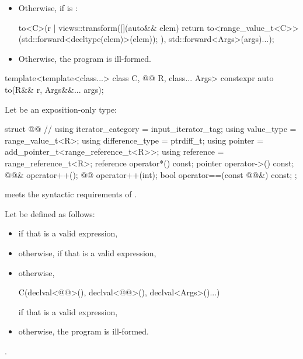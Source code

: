 \begin{itemdescr}
\begin{itemize}
\item
Otherwise,
if  is :
\begin{codeblock}
to<C>(r | views::transform([](auto&& elem) {
  return to<range_value_t<C>>(std::forward<decltype(elem)>(elem));
}), std::forward<Args>(args)...);
\end{codeblock}

\item
Otherwise, the program is ill-formed.
\end{itemize}
\end{itemdescr}

%
\begin{itemdecl}
template<template<class...> class C, @@ R, class... Args>
  constexpr auto to(R&& r, Args&&... args);
\end{itemdecl}

\begin{itemdescr}
\pnum
Let  be an exposition-only type:
\begin{codeblock}
struct @@ {                        // \expos
  using iterator_category = input_iterator_tag;
  using value_type = range_value_t<R>;
  using difference_type = ptrdiff_t;
  using pointer = add_pointer_t<range_reference_t<R>>;
  using reference = range_reference_t<R>;
  reference operator*() const;
  pointer operator->() const;
  @@& operator++();
  @@ operator++(int);
  bool operator==(const @@&) const;
};
\end{codeblock}
\begin{note}
 meets
the syntactic requirements of .
\end{note}

\pnum
Let  be defined as follows:
\begin{itemize}
\item
{} if that is a valid expression,
\item
otherwise, 
if that is a valid expression,
\item
otherwise,
\begin{codeblock}
C(declval<@@>(), declval<@@>(), declval<Args>()...)
\end{codeblock}
if that is a valid expression,
\item
otherwise, the program is ill-formed.
\end{itemize}

\pnum
\returns
{}.
\end{itemdescr}

